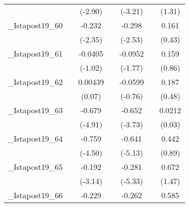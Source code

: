 {\begin{tabular}{l*{6}{c}}
            &                     &     (-2.90)         &                     &     (-3.21)         &                     &      (1.31)         \\
[1em]
\_Istapost19\_60&                     &      -0.232\sym{*}  &                     &      -0.298\sym{*}  &                     &       0.161         \\
            &                     &     (-2.35)         &                     &     (-2.53)         &                     &      (0.43)         \\
[1em]
\_Istapost19\_61&                     &     -0.0405         &                     &     -0.0952         &                     &       0.159         \\
            &                     &     (-1.02)         &                     &     (-1.77)         &                     &      (0.86)         \\
[1em]
\_Istapost19\_62&                     &     0.00439         &                     &     -0.0599         &                     &       0.187         \\
            &                     &      (0.07)         &                     &     (-0.76)         &                     &      (0.48)         \\
[1em]
\_Istapost19\_63&                     &      -0.679\sym{***}&                     &      -0.652\sym{***}&                     &      0.0212         \\
            &                     &     (-4.91)         &                     &     (-3.73)         &                     &      (0.03)         \\
[1em]
\_Istapost19\_64&                     &      -0.759\sym{***}&                     &      -0.641\sym{***}&                     &       0.442         \\
            &                     &     (-4.50)         &                     &     (-5.13)         &                     &      (0.89)         \\
[1em]
\_Istapost19\_65&                     &      -0.192\sym{**} &                     &      -0.281\sym{***}&                     &       0.672         \\
            &                     &     (-3.14)         &                     &     (-5.33)         &                     &      (1.47)         \\
[1em]
\_Istapost19\_66&                     &      -0.229\sym{***}&                     &      -0.262\sym{***}&                     &       0.585         \\

\end{tabular}}

